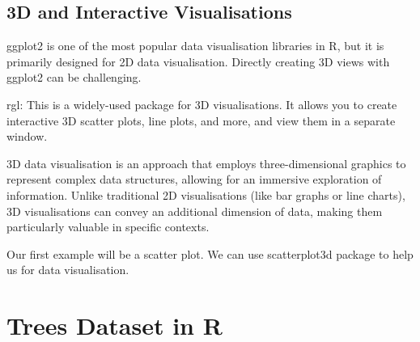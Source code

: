 \documentclass{article}\usepackage[]{graphicx}\usepackage[]{xcolor}
\begin{document}
{{\subsection{3D and Interactive Visualisations}
ggplot2 is one of the most popular data visualisation libraries in R, but it is primarily designed for 2D data visualisation. Directly creating 3D views with ggplot2 can be challenging.

rgl: This is a widely-used package for 3D visualisations. It allows you to create interactive 3D scatter plots, line plots, and more, and view them in a separate window.

3D data visualisation is an approach that employs three-dimensional graphics to represent complex data structures, allowing for an immersive exploration of information. Unlike traditional 2D visualisations (like bar graphs or line charts), 3D visualisations can convey an additional dimension of data, making them particularly valuable in specific contexts.

Our first example will be  a scatter plot. We can use scatterplot3d package  to help us for data visualisation.
\section{Trees Dataset in R}


}}
\end{document}
